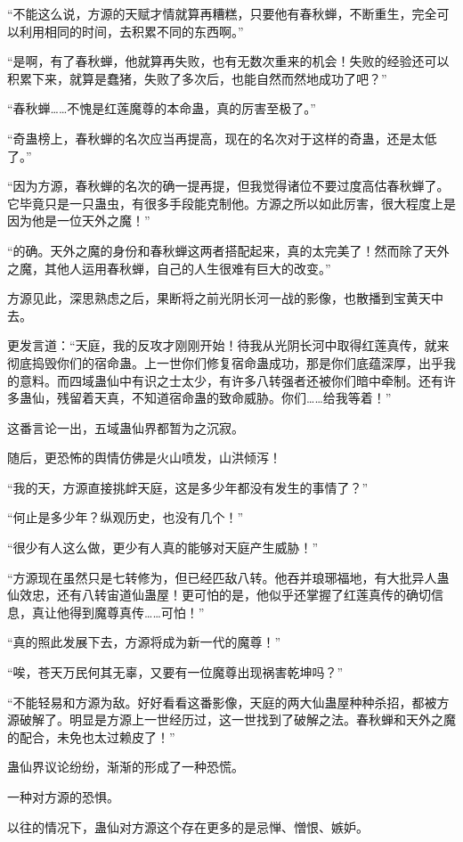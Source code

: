 \begin{this_body}
“不能这么说，方源的天赋才情就算再糟糕，只要他有春秋蝉，不断重生，完全可以利用相同的时间，去积累不同的东西啊。”

“是啊，有了春秋蝉，他就算再失败，也有无数次重来的机会！失败的经验还可以积累下来，就算是蠢猪，失败了多次后，也能自然而然地成功了吧？”

“春秋蝉……不愧是红莲魔尊的本命蛊，真的厉害至极了。”

“奇蛊榜上，春秋蝉的名次应当再提高，现在的名次对于这样的奇蛊，还是太低了。”

“因为方源，春秋蝉的名次的确一提再提，但我觉得诸位不要过度高估春秋蝉了。它毕竟只是一只蛊虫，有很多手段能克制他。方源之所以如此厉害，很大程度上是因为他是一位天外之魔！”

“的确。天外之魔的身份和春秋蝉这两者搭配起来，真的太完美了！然而除了天外之魔，其他人运用春秋蝉，自己的人生很难有巨大的改变。”

方源见此，深思熟虑之后，果断将之前光阴长河一战的影像，也散播到宝黄天中去。

更发言道：“天庭，我的反攻才刚刚开始！待我从光阴长河中取得红莲真传，就来彻底捣毁你们的宿命蛊。上一世你们修复宿命蛊成功，那是你们底蕴深厚，出乎我的意料。而四域蛊仙中有识之士太少，有许多八转强者还被你们暗中牵制。还有许多蛊仙，残留着天真，不知道宿命蛊的致命威胁。你们……给我等着！”

这番言论一出，五域蛊仙界都暂为之沉寂。

随后，更恐怖的舆情仿佛是火山喷发，山洪倾泻！

“我的天，方源直接挑衅天庭，这是多少年都没有发生的事情了？”

“何止是多少年？纵观历史，也没有几个！”

“很少有人这么做，更少有人真的能够对天庭产生威胁！”

“方源现在虽然只是七转修为，但已经匹敌八转。他吞并琅琊福地，有大批异人蛊仙效忠，还有八转宙道仙蛊屋！更可怕的是，他似乎还掌握了红莲真传的确切信息，真让他得到魔尊真传……可怕！”

“真的照此发展下去，方源将成为新一代的魔尊！”

“唉，苍天万民何其无辜，又要有一位魔尊出现祸害乾坤吗？”

“不能轻易和方源为敌。好好看看这番影像，天庭的两大仙蛊屋种种杀招，都被方源破解了。明显是方源上一世经历过，这一世找到了破解之法。春秋蝉和天外之魔的配合，未免也太过赖皮了！”

蛊仙界议论纷纷，渐渐的形成了一种恐慌。

一种对方源的恐惧。

以往的情况下，蛊仙对方源这个存在更多的是忌惮、憎恨、嫉妒。


\end{this_body}
